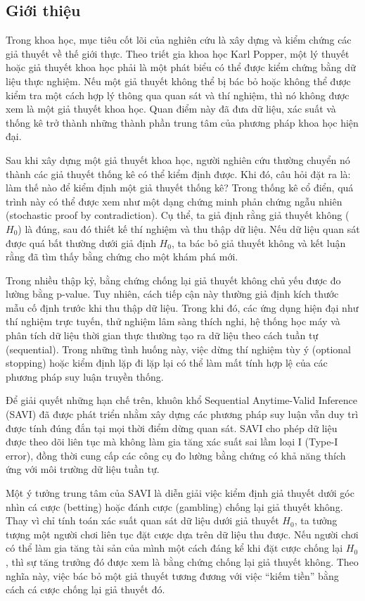 \subsection{Giới thiệu}

Trong khoa học, mục tiêu cốt lõi của nghiên cứu là xây dựng và kiểm chứng các
giả thuyết về thế giới thực. Theo triết gia khoa học Karl Popper, một
lý thuyết hoặc giả thuyết khoa học phải là một phát biểu có thể được kiểm chứng
bằng dữ liệu thực nghiệm. Nếu một giả thuyết không thể bị bác bỏ hoặc không thể
được kiểm tra một cách hợp lý thông qua quan sát và thí nghiệm, thì nó không
được xem là một giả thuyết khoa học. Quan điểm này đã đưa dữ liệu,
xác suất và thống kê trở thành những thành phần trung tâm của
phương pháp khoa học hiện đại.

Sau khi xây dựng một giả thuyết khoa học, người nghiên cứu thường chuyển nó
thành các giả thuyết thống kê có thể kiểm định được. Khi đó, câu hỏi
đặt ra là: làm thế nào để kiểm định một giả thuyết thống kê? Trong thống kê cổ
điển, quá trình này có thể được xem như một dạng chứng minh phản chứng
ngẫu nhiên (stochastic proof by contradiction). Cụ thể, ta giả định
rằng giả thuyết không ($H_0$) là đúng, sau đó thiết kế thí nghiệm và
thu thập dữ liệu. Nếu dữ liệu quan sát được quá bất thường dưới giả định $H_0$,
ta bác bỏ giả thuyết không và kết luận rằng đã tìm thấy bằng chứng cho một khám
phá mới.

Trong nhiều thập kỷ, bằng chứng chống lại giả thuyết không chủ yếu được đo
lường bằng p-value. Tuy nhiên, cách tiếp cận này thường giả
định kích thước mẫu cố định trước khi thu thập dữ liệu. Trong khi đó,
các ứng dụng hiện đại như thí nghiệm trực tuyến, thử nghiệm lâm sàng thích
nghi, hệ thống học máy và phân tích dữ liệu thời gian thực thường tạo ra dữ
liệu theo cách tuần tự (sequential). Trong những tình huống này, việc
dừng thí nghiệm tùy ý (optional stopping) hoặc kiểm định lặp
đi lặp lại có thể làm mất tính hợp lệ của các phương pháp suy luận truyền
thống.

Để giải quyết những hạn chế trên, khuôn khổ Sequential
Anytime-Valid Inference (SAVI) đã được phát triển nhằm xây dựng các phương
pháp suy luận vẫn duy trì được tính đúng đắn tại mọi thời điểm dừng quan sát.
SAVI cho phép dữ liệu được theo dõi liên tục mà không làm gia tăng xác
suất sai lầm loại I (Type-I error), đồng thời cung cấp các công cụ đo
lường bằng chứng có khả năng thích ứng với môi trường dữ liệu tuần tự.

Một ý tưởng trung tâm của SAVI là diễn giải việc kiểm định giả thuyết dưới góc
nhìn cá cược (betting) hoặc đánh cược
(gambling) chống lại giả thuyết không. Thay vì chỉ tính toán xác suất
quan sát dữ liệu dưới giả thuyết $H_0$, ta tưởng tượng một người chơi liên tục
đặt cược dựa trên dữ liệu thu được. Nếu người chơi có thể làm gia tăng tài sản
của mình một cách đáng kể khi đặt cược chống lại $H_0$, thì sự tăng trưởng đó
được xem là bằng chứng chống lại giả thuyết không. Theo nghĩa này, việc bác bỏ
một giả thuyết tương đương với việc ``kiếm tiền'' bằng cách cá cược chống lại
giả thuyết đó.

